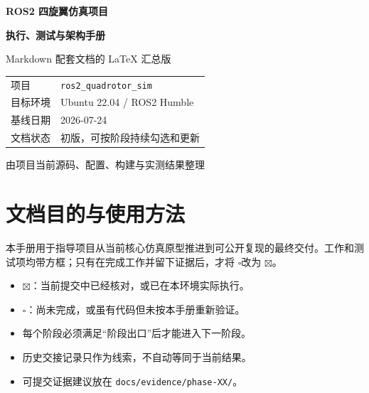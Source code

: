 \documentclass[UTF8,a4paper,12pt,fontset=fandol]{ctexart}
\newcommand{\unchecked}{\(\square\)}
\newcommand{\checked}{\(\boxtimes\)}
\newcommand{\code}[1]{\texttt{#1}}
\begin{document}
\begin{titlepage}
  \centering
  \vspace*{2.0cm}
  {\Huge\bfseries\color{Primary} ROS2 四旋翼仿真项目\par}
  \vspace{0.6cm}
  {\LARGE\bfseries 执行、测试与架构手册\par}
  \vspace{1.2cm}
  {\large Markdown 配套文档的 LaTeX 汇总版\par}
  \vfill
  \begin{tcolorbox}[
    width=0.82\textwidth,
    colback=SoftBlue,
    colframe=Primary,
    boxrule=0.8pt,
    arc=3pt
  ]
    \centering
    \begin{tabular}{@{}ll@{}}
      项目 & \code{ros2\_quadrotor\_sim} \\
      目标环境 & Ubuntu 22.04 / ROS2 Humble \\
      基线日期 & 2026-07-24 \\
      文档状态 & 初版，可按阶段持续勾选和更新 \\
    \end{tabular}
  \end{tcolorbox}
  \vfill
  {\large 由项目当前源码、配置、构建与实测结果整理\par}
  \vspace{1.0cm}
\end{titlepage}

\tableofcontents
\clearpage
{}

\section{文档目的与使用方法}

本手册用于指导项目从当前核心仿真原型推进到可公开复现的最终交付。工作和测试项均带方框；只有在完成工作并留下证据后，才将 \unchecked 改为 \checked。

\begin{itemize}
  \item \checked：当前提交中已经核对，或已在本环境实际执行。
  \item \unchecked：尚未完成，或虽有代码但未按本手册重新验证。
  \item 每个阶段必须满足“阶段出口”后才能进入下一阶段。
  \item 历史交接记录只作为线索，不自动等同于当前结果。
  \item 可提交证据建议放在 \code{docs/evidence/phase-XX/}。
\end{itemize}
\end{document}

